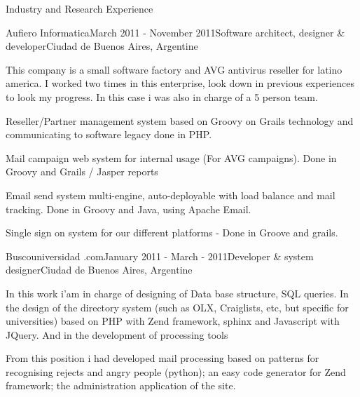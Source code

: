 \documentclass{resume} %
\begin{document}
\begin{rSection}{Industry and Research Experience}
\begin{rSubsection}{Aufiero Informatica}{March 2011 - November 2011}{Software architect, designer \& developer}{Ciudad de Buenos Aires, Argentine}
\item This company is a small software factory and AVG antivirus reseller for latino america. I worked two times in this enterprise, look down in previous experiences to look my progress. In this case i was also in charge of a 5 person team.
\item Reseller/Partner management system based on Groovy on Grails technology and communicating to software legacy done in PHP.
\item Mail campaign web system for internal usage (For AVG campaigns). Done in Groovy and Grails / Jasper reports
\item Email send system multi-engine, auto-deployable with load balance and mail tracking. Done in Groovy and Java, using Apache Email. 
\item Single sign on system for our different platforms - Done in Groove and grails.
\end{rSubsection}


\begin{rSubsection}{Buscouniversidad .com}{January 2011 -  March - 2011}{Developer \& system designer}{Ciudad de Buenos Aires, Argentine}
\item In this work i'am in charge of designing of Data base structure, SQL queries. In the design of the directory system (such as OLX, Craiglists, etc, but specific for universities)  based on PHP with Zend framework, sphinx and Javascript with JQuery.  And in the development of processing tools
\item From this position i had developed mail processing based on patterns for recognising rejects and angry people (python); an easy code generator for Zend framework; the administration application of the site. 
\end{rSubsection}


\end{rSection}
\end{document}
